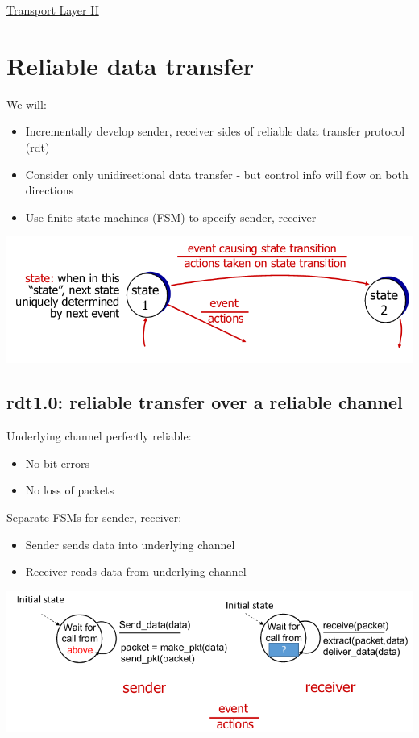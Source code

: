 \documentclass{article}[18pt]
\begin{document}
\begin{center}
\underline{\huge Transport Layer II}
\end{center}
\section{Reliable data transfer}
We will:
\begin{itemize}
	\item Incrementally develop sender, receiver sides of reliable data transfer protocol (rdt)
	\item Consider only unidirectional data transfer - but control info will flow on both directions
	\item Use finite state machines (FSM) to specify sender, receiver
\end{itemize}
\begin{center}
	\includegraphics[scale=0.7]{rdt}
\end{center}
\subsection{rdt1.0: reliable transfer over a reliable channel}
Underlying channel perfectly reliable:
\begin{itemize}
	\item No bit errors
	\item No loss of packets
\end{itemize}
Separate FSMs for sender, receiver:
\begin{itemize}
	\item Sender sends data into underlying channel
	\item Receiver reads data from underlying channel
\end{itemize}
\begin{center}
	\includegraphics[scale=0.7]{rdt1}
\end{center}
\end{document}
